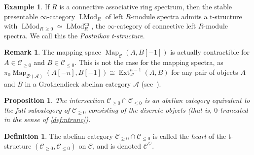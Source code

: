 \documentclass{article}
\newtheorem{proposition}{Proposition}[subsection]
\theoremstyle{definition}
\newtheorem{definition}{Definition}[subsection]
\newtheorem{example}{Example}[subsection]
\newtheorem{remark}{Remark}[subsection]
\newcommand{\A}{\mathcal{A}}
\newcommand{\C}{\mathcal{C}}
\newcommand{\D}{\mathcal{D}}
\DeclareMathOperator{\LMod}{LMod}
\DeclareMathOperator{\Ext}{Ext}
\DeclareMathOperator{\Map}{Map}
\newcommand{\cn}{\mathrm{cn}}
\begin{document}
\begin{example}\label{ex:t'}
If $R$ is a connective associative ring spectrum, then the stable presentable $\infty$-category $\LMod_R$ of left $R$-module spectra admits a t-structure with $\LMod_{R\,\geq 0}\simeq\LMod_R^{\cn}$, the $\infty$-category of connective left $R$-module spectra.
We call this the {\em Postnikov t-structure}.
\end{example}

\begin{remark}
The mapping space $\Map_\C(A,B[-1])$ is actually
contractible for $A\in \C_{\geq 0}$ and $B\in \C_{\leq 0}$. This is not
the case for the mapping spectra, as
$\pi_{0}\Map_{\D(\A)}(A[-n],B[-1])\cong\Ext^{n-1}_\A(A,B)$ for any pair of objects $A$ and $B$ in a Grothendieck abelian category $\A$
(see~\cite[Proposition~1.3.5.6]{HA}).
\end{remark}
\begin{proposition}{\em \cite[Remark 1.2.1.12 and Warning 1.2.1.9]{HA}}
The intersection $\C_{\geq 0}\cap \C_{\leq 0}$ is an abelian category equivalent to the full subcategory of $\C_{\geq 0}$ consisting of the discrete objects (that is, $0$-truncated in the sense of \autoref{def:ntrunc}).
\end{proposition}



\begin{definition}
The abelian category $\C_{\geq 0}\cap \C_{\leq 0}$ is called the {\em heart}\index{${}^\heartsuit$} of the t-structure $(\C_{\geq 0},\C_{\leq 0})$ on $\C$, and is denoted $\C^{\heartsuit}$.
\end{definition}
\end{document}
